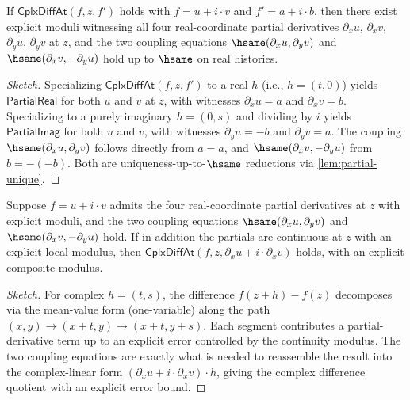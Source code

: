 \begin{theorem}
\label{thm:cauchy-riemann-forward}
If \(\mathsf{CplxDiffAt}(f, z, f')\) holds with \(f = u + i \cdot v\) and \(f' = a + i \cdot b\), then there exist explicit moduli witnessing all four real-coordinate partial derivatives \(\partial_x u\), \(\partial_x v\), \(\partial_y u\), \(\partial_y v\) at \(z\), and the two coupling equations
\(\hsame(\partial_x u, \partial_y v)\) and \(\hsame(\partial_x v, -\partial_y u)\)
hold up to \(\hsame\) on real histories.
\end{theorem}
\begin{proof}[Sketch]
Specializing \(\mathsf{CplxDiffAt}(f, z, f')\) to a real \(h\) (i.e., \(h = (t, 0)\)) yields \(\mathsf{PartialReal}\) for both \(u\) and \(v\) at \(z\), with witnesses \(\partial_x u = a\) and \(\partial_x v = b\). Specializing to a purely imaginary \(h = (0, s)\) and dividing by \(i\) yields \(\mathsf{PartialImag}\) for both \(u\) and \(v\), with witnesses \(\partial_y u = -b\) and \(\partial_y v = a\). The coupling \(\hsame(\partial_x u, \partial_y v)\) follows directly from \(a = a\), and \(\hsame(\partial_x v, -\partial_y u)\) from \(b = -(-b)\). Both are uniqueness-up-to-\(\hsame\) reductions via \autoref{lem:partial-unique}.
\end{proof}

\begin{theorem}
\label{thm:cauchy-riemann-backward}
Suppose \(f = u + i \cdot v\) admits the four real-coordinate partial derivatives at \(z\) with explicit moduli, and the two coupling equations \(\hsame(\partial_x u, \partial_y v)\) and \(\hsame(\partial_x v, -\partial_y u)\) hold. If in addition the partials are continuous at \(z\) with an explicit local modulus, then \(\mathsf{CplxDiffAt}(f, z, \partial_x u + i \cdot \partial_x v)\) holds, with an explicit composite modulus.
\end{theorem}
\begin{proof}[Sketch]
For complex \(h = (t, s)\), the difference \(f(z+h) - f(z)\) decomposes via the mean-value form (one-variable) along the path \((x, y) \to (x + t, y) \to (x + t, y + s)\). Each segment contributes a partial-derivative term up to an explicit error controlled by the continuity modulus. The two coupling equations are exactly what is needed to reassemble the result into the complex-linear form \((\partial_x u + i \cdot \partial_x v) \cdot h\), giving the complex difference quotient with an explicit error bound.
\end{proof}


